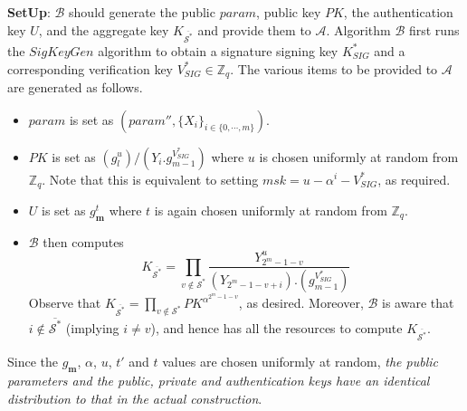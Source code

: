 \noindent \textbf{SetUp}: $\mathcal{B}$ should generate the public $param$, public key $PK$, the authentication key $U$, and the aggregate key $K_{\overline{{\mathcal{S}}^{*}}}$ and provide them to $\mathcal{A}$. Algorithm $\mathcal{B}$ first runs the $SigKeyGen$ algorithm to obtain a signature signing key $K^{*}_{SIG}$ and a corresponding verification key $V^{*}_{SIG} \in \mathbb{Z}_q$. The various items to be provided to $\mathcal{A}$ are generated as follows.
\begin{itemize}
  \item $param$ is set as $(param'',\{X_i\}_{i\in\{0,\cdots,m\}})\nonumber$.
  \item $PK$ is set as $\left({g^u_{l}}\right)/{\left(Y_i.g^{V^{*}_{SIG}}_{m-1}\right)}$ where $u$ is chosen uniformly at random from $\mathbb{Z}_q$. Note that this is equivalent to setting $msk=u-\alpha^i-V^{*}_{SIG}$, as required.
  \item $U$ is set as $g^{t}_{\mathbf{m}}$ where $t$ is again chosen uniformly at random from $\mathbb{Z}_q$.
  \item $\mathcal{B}$ then computes   
  \begin{equation}
   K_{\overline{{\mathcal{S}}^{*}}} = \prod_{v\notin{\mathcal{S}}^{*}}\frac{Y^{u}_{2^m-1-v}}{(Y_{2^m-1-v+i}).(g^{V^{*}_{SIG}}_{m-1})}\nonumber
  \end{equation}
  \noindent Observe that $K_{\overline{{\mathcal{S}}^{*}}}=\prod_{v\notin{\mathcal{S}}^{*}}PK^{\alpha^{2^m-1-v}}$, as desired. Moreover, $\mathcal{B}$ is aware that $i\notin \overline{{\mathcal{S}}^{*}}$ (implying $i\neq v$), and hence has all the resources to compute $K_{\overline{{\mathcal{S}}^{*}}}$.  
\end{itemize}
 
\noindent Since the $g_{\mathbf{m}}$, $\alpha$, $u$, $t'$ and $t$ values are chosen uniformly at random, \emph{the public parameters and the public, private and authentication keys have an identical distribution to that in the actual construction}.\\

